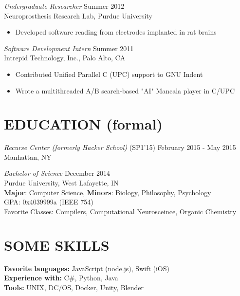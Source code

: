 \documentclass[margin,4pt]{res} %
\begin{document}
\begin{resume}
	{\sl Undergraduate Researcher} \hfill Summer 2012\\
          Neuroprosthesis Research Lab, Purdue University
	    	\begin{itemize} \itemsep -2pt
	    	\item Developed software reading from electrodes implanted in rat brains
	    	\end{itemize}

	{\sl Software Development Intern} \hfill Summer 2011\\
          Intrepid Technology, Inc., Palo Alto, CA
          \begin{itemize}  \itemsep -2pt
		\item Contributed Unified Parallel C (UPC) support to GNU Indent
		\item Wrote a multithreaded A/B search-based "AI" Mancala player in C/UPC
		\end{itemize}


\section{EDUCATION (formal)}
	{\sl Recurse Center (formerly Hacker School)} \hfill (SP1'15) February 2015 - May 2015\\
		Manhattan, NY

	{\sl Bachelor of Science }\hfill  December 2014\\
		Purdue University, West Lafayette, IN\\
		\textbf{Major}: Computer Science, \textbf{Minors}: Biology, Philosophy, Psychology \\
		GPA: 0x4039999a (IEEE 754) \\
		Favorite Classes: Compilers, Computational Neurosceince, Organic Chemistry


\section{SOME SKILLS} 
	{\bf Favorite languages: } JavaScript (node.js), Swift (iOS)\\
 	{\bf Experience with:}  C\#, Python, Java \\
	{\bf Tools:} UNIX, DC/OS, Docker, Unity, Blender



\end{resume}
\end{document}
